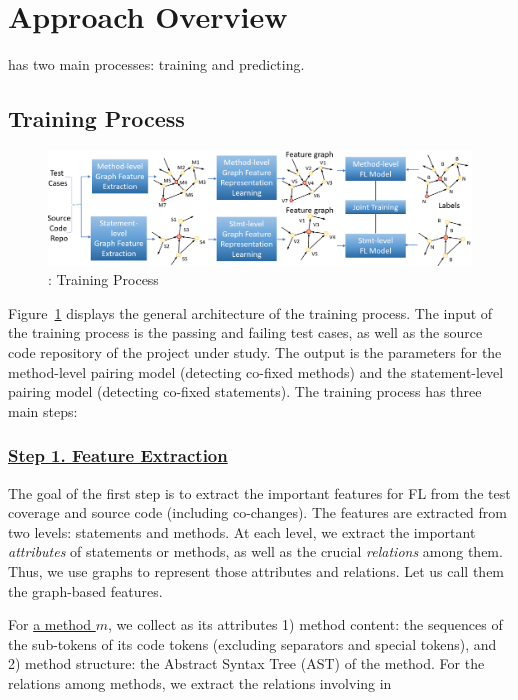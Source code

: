 \section{Approach Overview}
\label{overview:sec}

{\tool} has two main processes: training and predicting.

\subsection{Training Process}

\begin{figure}[t]
	\centering
	\includegraphics[width=5.6in]{graphs/overview-training.png}
	\caption{{\tool}: Training Process}
	\label{train-overview}
\end{figure}

Figure~\ref{train-overview} displays
the general architecture of the training process. The input of the
training process is the passing and failing test cases, as well as the
source code repository of the project under study. The output is the
parameters for the method-level pairing model (detecting co-fixed
methods) and the statement-level pairing model (detecting co-fixed
statements). The training process has three main steps:

\subsubsection*{\underline{Step 1. Feature Extraction}}
The goal of the first step is to extract the important features for FL
from the test coverage and source code (including co-changes). The
features are extracted from two levels: statements and methods. At
each level, we extract the important {\em attributes} of statements or
methods, as well as the crucial {\em relations} among them. Thus, we
use graphs to represent those attributes and relations. Let us call
them the graph-based features.

For \underline{a method $m$}, we collect as its attributes 1) method
content: the sequences of the sub-tokens of its code tokens (excluding
separators and special tokens), and 2) method structure: the Abstract
Syntax Tree (AST) of the method. For the relations among methods, we
extract the relations involving in


